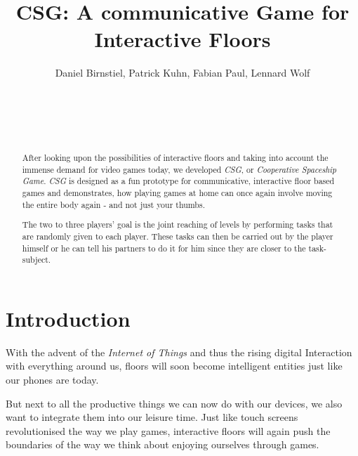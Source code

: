 \documentclass{sigchi}
\begin{document}
\title{CSG: A communicative Game for Interactive Floors}

\author{
  \alignauthor Daniel Birnstiel, Patrick Kuhn, Fabian Paul, Lennard Wolf\\
      \medskip
    \\
    \\
    \\
    \\
}

\maketitle

\begin{abstract}
\vspace{1mm}
After looking upon the possibilities of interactive floors and taking into account the immense demand for video games today, we developed \textit{CSG}, or \textit{Cooperative Spaceship Game}. \textit{CSG} is designed as a fun prototype for communicative, interactive floor based games and demonstrates, how playing games at home can once again involve moving the entire body
again - and not just your thumbs.


The two to three players' goal is the joint reaching of levels by performing tasks that are randomly given to each player. These tasks can then be carried out by the player himself or he can tell his partners to do it for him since they are closer to the task-subject. 

\end{abstract}


\section{Introduction}
\vspace{1mm}
With the advent of the \textit{Internet of Things} and thus the rising digital Interaction with everything around us, floors will soon become intelligent entities just like our phones are today. 

But next to all the productive things we can now do with our devices, we also want to integrate them into our leisure time. Just like touch screens revolutionised the way we play games, interactive floors will again push the boundaries of the way we think about enjoying ourselves through games.
\end{document}
